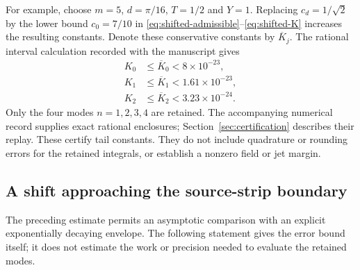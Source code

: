 For example, choose $m=5$, $d=\pi/16$, $T=1/2$ and $Y=1$.
Replacing $c_d=1/\sqrt2$ by the lower bound $c_0=7/10$ in
\eqref{eq:shifted-admissible}--\eqref{eq:shifted-K} increases the resulting
constants. Denote these conservative constants by $\overline K_j$.
The rational interval calculation recorded with the manuscript gives
\begin{equation}\label{eq:shifted-example}
 \begin{split}
 K_0&\le\overline K_0<8\times10^{-23},\\
 K_1&\le\overline K_1<1.61\times10^{-23},\\
 K_2&\le\overline K_2<3.23\times10^{-24}.
 \end{split}
\end{equation}
Only the four modes $n=1,2,3,4$ are retained. The accompanying numerical
record supplies exact rational enclosures; Section~\ref{sec:certification}
describes their replay. These certify tail constants. They do not include
quadrature or rounding errors for the retained integrals, or establish a
nonzero field or jet margin.

\subsection{A shift approaching the source-strip boundary}

The preceding estimate permits an asymptotic comparison with an explicit
exponentially decaying envelope. The following statement gives the error
bound itself; it does not estimate the work or precision needed to
evaluate the retained modes.

